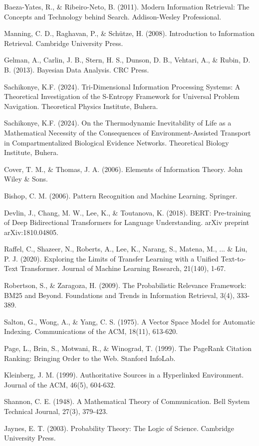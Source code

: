 \documentclass[12pt,a4paper]{article}
\begin{document}
\begin{thebibliography}{99}

Baeza-Yates, R., \& Ribeiro-Neto, B. (2011). Modern Information Retrieval: The Concepts and Technology behind Search. Addison-Wesley Professional.

Manning, C. D., Raghavan, P., \& Schütze, H. (2008). Introduction to Information Retrieval. Cambridge University Press.

Gelman, A., Carlin, J. B., Stern, H. S., Dunson, D. B., Vehtari, A., \& Rubin, D. B. (2013). Bayesian Data Analysis. CRC Press.

Sachikonye, K.F. (2024). Tri-Dimensional Information Processing Systems: A Theoretical Investigation of the S-Entropy Framework for Universal Problem Navigation. Theoretical Physics Institute, Buhera.

Sachikonye, K.F. (2024). On the Thermodynamic Inevitability of Life as a Mathematical Necessity of the Consequences of Environment-Assisted Transport in Compartmentalized Biological Evidence Networks. Theoretical Biology Institute, Buhera.

Cover, T. M., \& Thomas, J. A. (2006). Elements of Information Theory. John Wiley \& Sons.

Bishop, C. M. (2006). Pattern Recognition and Machine Learning. Springer.

Devlin, J., Chang, M. W., Lee, K., \& Toutanova, K. (2018). BERT: Pre-training of Deep Bidirectional Transformers for Language Understanding. arXiv preprint arXiv:1810.04805.

Raffel, C., Shazeer, N., Roberts, A., Lee, K., Narang, S., Matena, M., ... \& Liu, P. J. (2020). Exploring the Limits of Transfer Learning with a Unified Text-to-Text Transformer. Journal of Machine Learning Research, 21(140), 1-67.

Robertson, S., \& Zaragoza, H. (2009). The Probabilistic Relevance Framework: BM25 and Beyond. Foundations and Trends in Information Retrieval, 3(4), 333-389.

Salton, G., Wong, A., \& Yang, C. S. (1975). A Vector Space Model for Automatic Indexing. Communications of the ACM, 18(11), 613-620.

Page, L., Brin, S., Motwani, R., \& Winograd, T. (1999). The PageRank Citation Ranking: Bringing Order to the Web. Stanford InfoLab.

Kleinberg, J. M. (1999). Authoritative Sources in a Hyperlinked Environment. Journal of the ACM, 46(5), 604-632.

Shannon, C. E. (1948). A Mathematical Theory of Communication. Bell System Technical Journal, 27(3), 379-423.

Jaynes, E. T. (2003). Probability Theory: The Logic of Science. Cambridge University Press.

\end{thebibliography}
\end{document}
